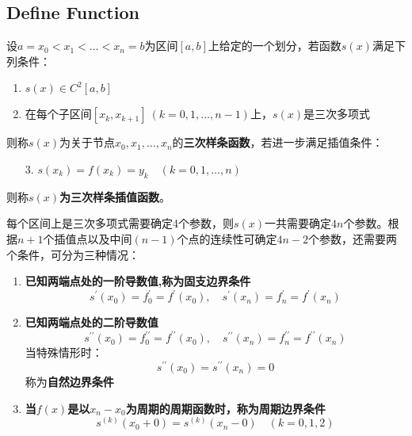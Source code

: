 \subsection{Define Function}
设$a=x_0<x_1<\dots <x_n=b$为区间$[a,b]$上给定的一个划分，若函数$s(x)$满足下列条件：
\begin{enumerate}
	\item $s(x) \in C^2[a,b]$
	\item 在每个子区间$[x_k,x_{k+1}]\ (k=0,1,\dots,n-1)$上，$s(x)$是三次多项式
\end{enumerate}
则称$s(x)$为关于节点$x_0,x_1,\dots,x_n$的\textbf{三次样条函数}，若进一步满足插值条件：
\begin{enumerate}
	\item[3.] $s(x_k) = f(x_k) = y_k\quad (k=0,1,\dots,n)$
\end{enumerate}
则称$s(x)$\textbf{为三次样条插值函数}。


每个区间上是三次多项式需要确定4个参数，则$s(x)$一共需要确定$4n$个参数。根据$n+1$个插值点以及中间$(n-1)$个点的连续性可确定$4n-2$个参数，还需要两个条件，可分为三种情况：

\begin{enumerate}
	\item \textbf{已知两端点处的一阶导数值,称为固支边界条件}
		\begin{equation}
		s^{\prime}(x_0) = f_0^{\prime} = f^{\prime}(x_0),\quad s^{\prime}(x_n) = f_n^{\prime} = f^{\prime}(x_n)
		\end{equation}
	\item \textbf{已知两端点处的二阶导数值}
		\begin{equation}
		s^{\prime \prime}(x_0) = f_0^{\prime \prime} = f^{\prime \prime}(x_0),\quad s^{\prime \prime}(x_n) = f_n^{\prime \prime} = f^{\prime \prime}(x_n)
		\end{equation}
	当特殊情形时：
		\begin{equation}
		s^{\prime \prime}(x_0) = s^{\prime \prime}(x_n) = 0
		\end{equation}
	称为\textbf{自然边界条件}
	\item \textbf{当$f(x)$是以$x_n-x_0$为周期的周期函数时，称为周期边界条件}
		\begin{equation}
		s^{(k)}(x_0+0) = s^{(k)}(x_n-0)\quad (k=0,1,2)
		\end{equation}
\end{enumerate}
\newpage


